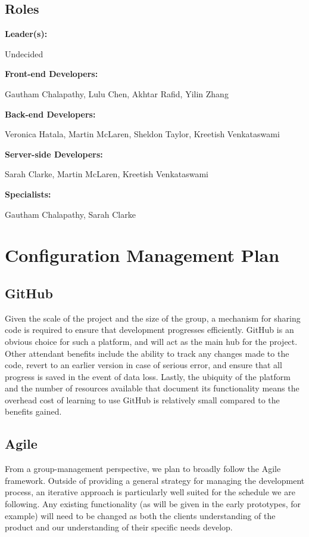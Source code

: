 \documentclass[11pt]{article}
\begin{document}
\subsection{Roles}
\textbf{Leader(s):}
\begin{addmargin}[1em]{2em} Undecided \end{addmargin}\vspace{2mm}
\textbf{Front-end Developers:}
\begin{addmargin}[1em]{2em} Gautham Chalapathy, Lulu Chen, Akhtar Rafid, Yilin Zhang
\end{addmargin}\vspace{2mm}
\textbf{Back-end Developers:}
\begin{addmargin}[1em]{2em} Veronica Hatala, Martin McLaren, Sheldon Taylor, Kreetish Venkataswami
\end{addmargin}\vspace{2mm}
\textbf{Server-side Developers:}
\begin{addmargin}[1em]{2em} Sarah Clarke, Martin McLaren, Kreetish Venkataswami
\end{addmargin}\vspace{2mm}
\textbf{Specialists:}
\begin{addmargin}[1em]{2em} Gautham Chalapathy, Sarah Clarke \end{addmargin}\vspace{2mm}

\section{Configuration Management Plan}

\subsection{GitHub}
Given the scale of the project and the size of the group, a mechanism for sharing code is required
to ensure that development progresses efficiently. GitHub is an obvious choice for such a platform,
and will act as the main hub for the project. Other attendant benefits include the ability to track
any changes made to the code, revert to an earlier version in case of serious error, and ensure that
all progress is saved in the event of data loss. Lastly, the ubiquity of the platform and the number
of resources available that document its functionality means the overhead cost of learning to use
GitHub is relatively small compared to the benefits gained.

\subsection{Agile}
From a group-management perspective, we plan to broadly follow the Agile framework. Outside of
providing a general strategy for managing the development process, an iterative approach is
particularly well suited for the schedule we are following. Any existing functionality (as will be
given in the early prototypes, for example) will need to be changed as both the clients
understanding of the product and our understanding of their specific needs develop.
\end{document}
